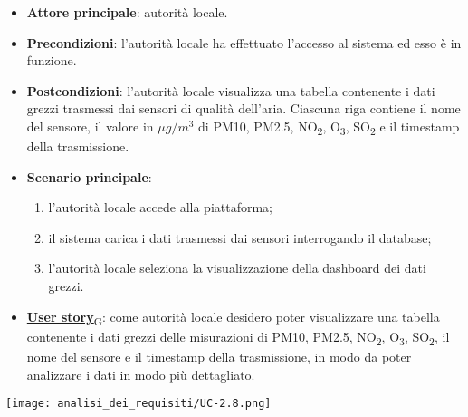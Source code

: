 \begin{itemize}
	\item \textbf{Attore principale}: autorità locale.
	\item \textbf{Precondizioni}: l'autorità locale ha effettuato l'accesso al sistema ed esso è in funzione.
	\item \textbf{Postcondizioni}: l'autorità locale visualizza una tabella contenente i dati grezzi trasmessi dai sensori di qualità dell'aria.
	      Ciascuna riga contiene il nome del sensore, il valore in $\mu g/m^3$ di PM10, PM2.5, NO\textsubscript{2}, O\textsubscript{3}, SO\textsubscript{2} e il timestamp della trasmissione.
	\item \textbf{Scenario principale}:
	      \begin{enumerate}
		      \item l'autorità locale accede alla piattaforma;
		      \item il sistema carica i dati trasmessi dai sensori interrogando il database;
		      \item l'autorità locale seleziona la visualizzazione della dashboard dei dati grezzi.
	      \end{enumerate}
	\item \href{https://7last.github.io/docs/pb/documentazione-interna/glossario\#user-story}{\textbf{User story}\textsubscript{G}}:
	      come autorità locale desidero poter visualizzare una tabella contenente i dati grezzi delle misurazioni di PM10, PM2.5, NO\textsubscript{2}, O\textsubscript{3}, SO\textsubscript{2},
	      il nome del sensore e il timestamp della trasmissione, in modo da poter analizzare i dati in modo più dettagliato.
\end{itemize}
\begin{center}
	\texttt{[image: analisi\_dei\_requisiti/UC-2.8.png]}
\end{center}


